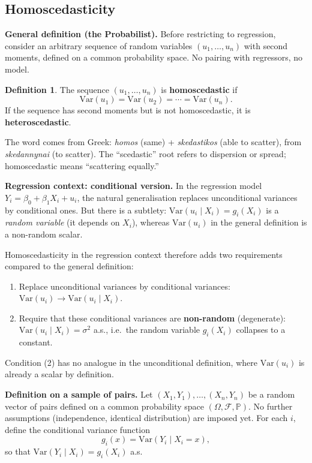 \documentclass[a4paper,oneside,12pt]{extarticle}
\theoremstyle{plain}
\theoremstyle{definition}
\newtheorem{definition}[proposition]{Definition}
\theoremstyle{remark}
\newcommand*{\Var}{\mathrm{Var}}
\newcommand*{\mP}{\mathbb{P}}
\newcommand*{\mbF}{\mathcal{F}}
\begin{document}
\subsection{Homoscedasticity}

\textbf{General definition (the Probabilist).}
Before restricting to regression, consider an arbitrary sequence of
random variables $(u_1,\ldots,u_n)$ with second moments, defined on a
common probability space. No pairing with regressors, no model.

\begin{definition}
The sequence $(u_1,\ldots,u_n)$ is \textbf{homoscedastic} if
\[
  \Var(u_1) = \Var(u_2) = \cdots = \Var(u_n).
\]
If the sequence has second moments but is not homoscedastic, it is
\textbf{heteroscedastic}.
\end{definition}

The word comes from Greek: \textit{homos} (same) + \textit{skedastikos}
(able to scatter), from \textit{skedannynai} (to scatter). The
``scedastic'' root refers to dispersion or spread; homoscedastic means
``scattering equally.''

\textbf{Regression context: conditional version.}
In the regression model $Y_i = \beta_0 + \beta_1 X_i + u_i$, the
natural generalisation replaces unconditional variances by conditional
ones. But there is a subtlety: $\Var(u_i \mid X_i) = g_i(X_i)$ is
a \emph{random variable} (it depends on $X_i$), whereas
$\Var(u_i)$ in the general definition is a non-random scalar.

Homoscedasticity in the regression context therefore adds two
requirements compared to the general definition:
\begin{enumerate}[label=(\arabic*)]
  \item Replace unconditional variances by conditional variances:
        $\Var(u_i) \to \Var(u_i \mid X_i)$.
  \item Require that these conditional variances are \textbf{non-random}
        (degenerate): $\Var(u_i \mid X_i) = \sigma^2$ a.s., i.e.\ the
        random variable $g_i(X_i)$ collapses to a constant.
\end{enumerate}
Condition (2) has no analogue in the unconditional definition, where
$\Var(u_i)$ is already a scalar by definition.

\textbf{Definition on a sample of pairs.}
Let $(X_1,Y_1),\ldots,(X_n,Y_n)$ be a random vector of pairs defined on
a common probability space $(\Omega,\mbF,\mP)$. No further assumptions
(independence, identical distribution) are imposed yet. For each $i$,
define the conditional variance function
\[
  g_i(x) = \Var(Y_i \mid X_i = x),
\]
so that $\Var(Y_i \mid X_i) = g_i(X_i)$ a.s.
\end{document}
